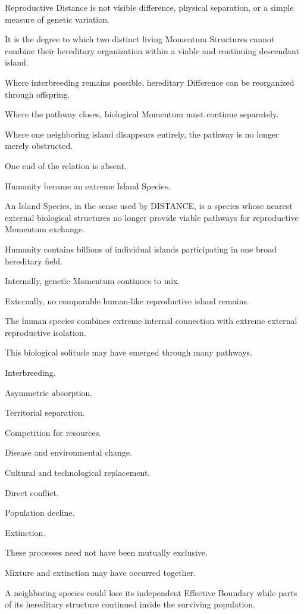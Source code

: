 Reproductive Distance is not visible difference, physical separation, or a simple measure of genetic variation.

It is the degree to which two distinct living Momentum Structures cannot combine their hereditary organization within a viable and continuing descendant island.

Where interbreeding remains possible, hereditary Difference can be reorganized through offspring.

Where the pathway closes, biological Momentum must continue separately.

Where one neighboring island disappears entirely, the pathway is no longer merely obstructed.

One end of the relation is absent.

Humanity became an extreme Island Species.

An Island Species, in the sense used by DISTANCE, is a species whose nearest external biological structures no longer provide viable pathways for reproductive Momentum exchange.

Humanity contains billions of individual islands participating in one broad hereditary field.

Internally, genetic Momentum continues to mix.

Externally, no comparable human-like reproductive island remains.

The human species combines extreme internal connection with extreme external reproductive isolation.

This biological solitude may have emerged through many pathways.

Interbreeding.

Asymmetric absorption.

Territorial separation.

Competition for resources.

Disease and environmental change.

Cultural and technological replacement.

Direct conflict.

Population decline.

Extinction.

These processes need not have been mutually exclusive.

Mixture and extinction may have occurred together.

A neighboring species could lose its independent Effective Boundary while parts of its hereditary structure continued inside the surviving population.

